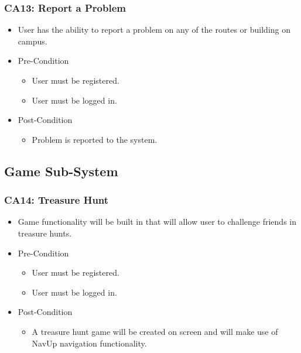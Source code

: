 \documentclass[12pt,a4paper]{article}
\begin{document}
		\subsubsection{CA13: Report a Problem}
			\begin{itemize}
				\item User has the ability to report a problem on any of the routes or building on campus.
				\item Pre-Condition
					\begin{itemize}
						\item User must be registered.
						\item User must be logged in.
					\end{itemize}
				\item Post-Condition
					\begin{itemize}
						\item Problem is reported to the system.
					\end{itemize}
			\end{itemize}
	\subsection{Game Sub-System}
		\subsubsection{CA14: Treasure Hunt}
			\begin{itemize}
				\item Game functionality will be built in that will allow user to challenge friends in treasure hunts.
				\item Pre-Condition
					\begin{itemize}
						\item User must be registered.
						\item User must be logged in.
					\end{itemize}
				\item Post-Condition
					\begin{itemize}
						\item A treasure hunt game will be created on screen and will make use of NavUp navigation functionality.
					\end{itemize}
			\end{itemize}
\end{document}
